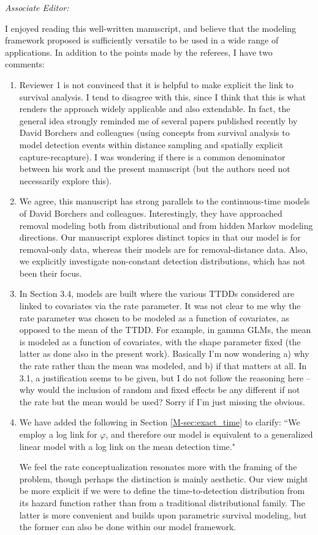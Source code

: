 \documentclass[12pt]{article}
\renewenvironment{quote}  %
              {\list{}{\rightmargin\leftmargin}\normalfont%
               \item\relax}
              {\endlist}
\begin{document}
\itshape
Associate Editor:

I enjoyed reading this well-written manuscript, and believe that the modeling framework proposed is sufficiently versatile to be used in a wide range of applications. In addition to the points made by the referees, I have two comments:
\begin{enumerate}
\item Reviewer 1 is not convinced that it is helpful to make explicit the link to survival analysis. I tend to disagree with this, since I think that this is what renders the approach widely applicable and also extendable. In fact, the general idea strongly reminded me of several papers published recently by David Borchers and colleagues (using concepts from survival analysis to model detection events within distance sampling and spatially explicit capture-recapture). I was wondering if there is a common denominator between his work and the present manuscript (but the authors need not necessarily explore this).
\begin{quote}
We agree, this manuscript has strong parallels to the continuous-time models of David Borchers and colleagues.  
Interestingly, they have approached removal modeling both from distributional and from hidden Markov modeling directions.
Our manuscript explores distinct topics in that our model is for removal-only data, whereas their models are for removal-distance data.
Also, we explicitly investigate non-constant detection distributions, which has not been their focus.
\end{quote}


\item In Section 3.4, models are built where the various TTDDs considered are linked to covariates via the rate parameter. It was not clear to me why the rate parameter was chosen to be modeled as a function of covariates, as opposed to the mean of the TTDD. For example, in gamma GLMs, the mean is modeled as a function of covariates, with the shape parameter fixed (the latter as done also in the present work). Basically I'm now wondering a) why the rate rather than the mean was modeled, and b) if that matters at all. In 3.1, a justification seems to be given, but I do not follow the reasoning here – why would the inclusion of random and fixed effects be any different if not the rate but the mean would be used? Sorry if I'm just missing the obvious.
\begin{quote}
We have added the following in Section \ref{M-sec:exact_time} to clarify: ``We employ a log link for $\varphi$, and therefore our model is equivalent to a generalized linear model with a log link on the mean detection time."

We feel the rate conceptualization resonates more with the framing of the problem, though perhaps the distinction is mainly aesthetic.
Our view might be more explicit if we were to define the time-to-detection distribution from its hazard function rather than from a traditional distributional family. 
The latter is more convenient and builds upon parametric survival modeling, but the former can also be done within our model framework.
\end{quote}
\end{enumerate}
\end{document}
